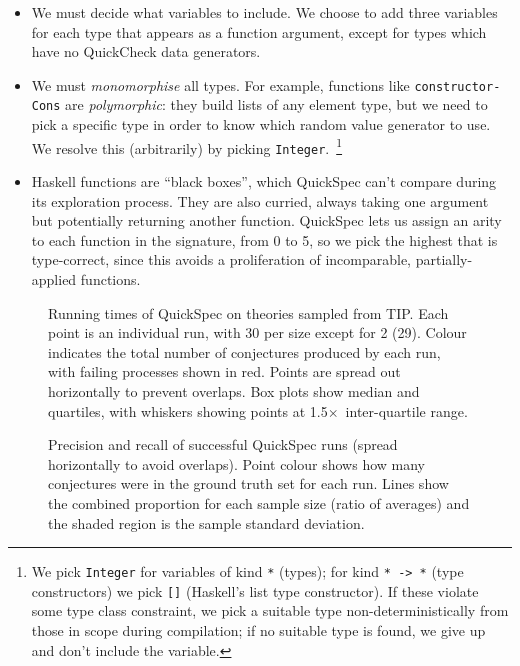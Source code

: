 \begin{itemize}
\item We must decide what variables to include. We choose to add three variables
  for each type that appears as a function argument, except for types which have
  no QuickCheck data generators.
\item We must \emph{monomorphise} all types. For example, functions like
  \texttt{constructor-Cons} are \emph{polymorphic}: they build lists of any
  element type, but we need to pick a specific type in order to know which
  random value generator to use. We resolve this (arbitrarily) by picking
  \texttt{Integer}.~\footnote{We pick \texttt{Integer} for variables of kind
    \texttt{*} (types); for kind \texttt{* -> *} (type constructors) we pick
    \texttt{[]} (Haskell's list type constructor). If these violate some
    type class constraint, we pick a suitable type non-deterministically from
    those in scope during compilation; if no suitable type is found, we give up
    and don't include the  variable.}
\item Haskell functions are ``black boxes'', which QuickSpec can't compare
  during its exploration process. They are also curried, always taking one
  argument but potentially returning another function. QuickSpec lets us assign
  an arity to each function in the signature, from 0 to 5, so we pick the
  highest that is type-correct, since this avoids a proliferation of
  incomparable, partially-applied functions.
\end{itemize}

\begin{figure}
  \centering
  
  \caption{Running times of QuickSpec on theories sampled from TIP. Each point
    is an individual run, with 30 per size except for 2 (29). Colour indicates
    the total number of conjectures produced by each run, with failing processes
    shown in red. Points are spread out horizontally to prevent overlaps.
    Box plots show median and quartiles, with whiskers showing points at
    1.5$\times$~inter-quartile range.}
  \label{figure:quickspec_runtimes}
\end{figure}

\begin{figure}
  \centering
  
  \caption{Precision and recall of successful QuickSpec runs (spread
    horizontally to avoid overlaps). Point colour shows how many conjectures
    were in the ground truth set for each run. Lines show the combined
    proportion for each sample size (ratio of averages) and the shaded region is
    the sample standard deviation.}
  \label{figure:quickspec_precRec}
\end{figure}

